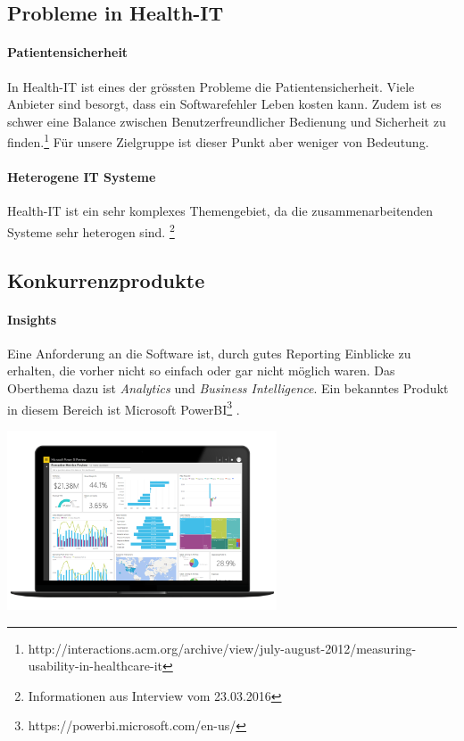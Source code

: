 \documentclass[a4paper]{scrreprt}
\begin{document}
\subsection{Probleme in Health-IT}
\paragraph{Patientensicherheit} In Health-IT ist eines der grössten Probleme die Patientensicherheit. Viele Anbieter sind besorgt, dass ein Softwarefehler Leben kosten kann. Zudem ist es schwer eine Balance zwischen Benutzerfreundlicher Bedienung und Sicherheit zu finden.\footnote{http://interactions.acm.org/archive/view/july-august-2012/measuring-usability-in-healthcare-it}
Für unsere Zielgruppe ist dieser Punkt aber weniger von Bedeutung.

\paragraph{Heterogene IT Systeme} Health-IT ist ein sehr komplexes Themengebiet, da die zusammenarbeitenden Systeme sehr heterogen sind. \footnote{Informationen aus Interview vom 23.03.2016}



\subsection{Konkurrenzprodukte}
\paragraph{Insights} Eine Anforderung an die Software ist, durch gutes Reporting Einblicke zu erhalten, die vorher nicht so einfach oder gar nicht möglich waren. Das Oberthema dazu ist \textit{Analytics} und \textit{Business Intelligence}. Ein bekanntes Produkt in diesem Bereich ist Microsoft PowerBI\footnote{https://powerbi.microsoft.com/en-us/} .

\includegraphics[width=0.6\textwidth]{img/research_ms-powerbi.png}
\end{document}
